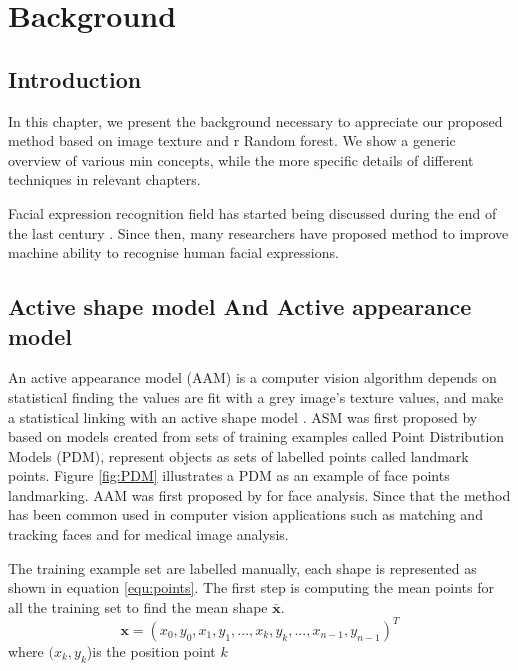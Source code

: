  \chapter{Background}
 \section{Introduction}

 In this chapter, we present the background necessary to appreciate our proposed method based on image texture and r Random forest. We show a generic overview of various min concepts, while the more specific details of different techniques in relevant chapters. 
 
 Facial expression recognition field has started being discussed during the end of the last century \citep{essa1995facial}. Since then, many researchers have proposed method to improve machine ability to recognise human facial expressions.   

 
\section{Active shape model And  Active appearance model}
An active appearance model (AAM) \citep{edwards1998interpreting, cootes1998activeApearance,cootes2001active} is a computer vision algorithm depends on  statistical finding the values are fit with a grey image's texture values, and make a statistical linking with an active shape model \citep{cootes1992active,cootes1992training,cootes1995active}.
ASM was first proposed by \citet{cootes1992active} based on models created from sets of training examples called Point Distribution Models (PDM), represent objects as sets of labelled points called landmark points. Figure \ref{fig:PDM} illustrates a PDM as an example of face points landmarking. AAM was first proposed by \citet{edwards1998interpreting} for face analysis. Since that the method has  been common used in computer vision applications such as matching and tracking faces and for medical image analysis. 

The training example set are labelled manually, each shape is represented as shown in equation \ref{equ:points}. The first step is computing the mean points for all the training set to find the mean shape $\boldsymbol{\bar{x}}$. 
\begin{equation}
\boldsymbol{x} = (x_0, y_0 , x_1, y_1,  ..., x_k, y_k, ..., x_{n-1}, y_{n-1})^T
    \label{equ:points}
\end{equation}
where $ (x_k, y_k$)is the position point $k$ 


